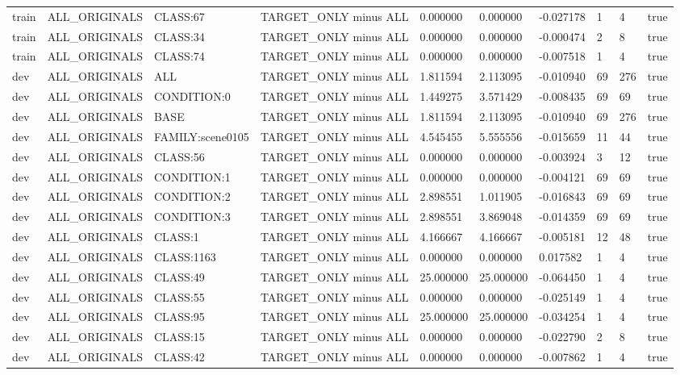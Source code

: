 \begin{tabular}{llllllllll}
train & ALL\_ORIGINALS & CLASS:67 & TARGET\_ONLY minus ALL & 0.000000 & 0.000000 & -0.027178 & 1 & 4 & true \\
train & ALL\_ORIGINALS & CLASS:34 & TARGET\_ONLY minus ALL & 0.000000 & 0.000000 & -0.000474 & 2 & 8 & true \\
train & ALL\_ORIGINALS & CLASS:74 & TARGET\_ONLY minus ALL & 0.000000 & 0.000000 & -0.007518 & 1 & 4 & true \\
dev & ALL\_ORIGINALS & ALL & TARGET\_ONLY minus ALL & 1.811594 & 2.113095 & -0.010940 & 69 & 276 & true \\
dev & ALL\_ORIGINALS & CONDITION:0 & TARGET\_ONLY minus ALL & 1.449275 & 3.571429 & -0.008435 & 69 & 69 & true \\
dev & ALL\_ORIGINALS & BASE & TARGET\_ONLY minus ALL & 1.811594 & 2.113095 & -0.010940 & 69 & 276 & true \\
dev & ALL\_ORIGINALS & FAMILY:scene0105 & TARGET\_ONLY minus ALL & 4.545455 & 5.555556 & -0.015659 & 11 & 44 & true \\
dev & ALL\_ORIGINALS & CLASS:56 & TARGET\_ONLY minus ALL & 0.000000 & 0.000000 & -0.003924 & 3 & 12 & true \\
dev & ALL\_ORIGINALS & CONDITION:1 & TARGET\_ONLY minus ALL & 0.000000 & 0.000000 & -0.004121 & 69 & 69 & true \\
dev & ALL\_ORIGINALS & CONDITION:2 & TARGET\_ONLY minus ALL & 2.898551 & 1.011905 & -0.016843 & 69 & 69 & true \\
dev & ALL\_ORIGINALS & CONDITION:3 & TARGET\_ONLY minus ALL & 2.898551 & 3.869048 & -0.014359 & 69 & 69 & true \\
dev & ALL\_ORIGINALS & CLASS:1 & TARGET\_ONLY minus ALL & 4.166667 & 4.166667 & -0.005181 & 12 & 48 & true \\
dev & ALL\_ORIGINALS & CLASS:1163 & TARGET\_ONLY minus ALL & 0.000000 & 0.000000 & 0.017582 & 1 & 4 & true \\
dev & ALL\_ORIGINALS & CLASS:49 & TARGET\_ONLY minus ALL & 25.000000 & 25.000000 & -0.064450 & 1 & 4 & true \\
dev & ALL\_ORIGINALS & CLASS:55 & TARGET\_ONLY minus ALL & 0.000000 & 0.000000 & -0.025149 & 1 & 4 & true \\
dev & ALL\_ORIGINALS & CLASS:95 & TARGET\_ONLY minus ALL & 25.000000 & 25.000000 & -0.034254 & 1 & 4 & true \\
dev & ALL\_ORIGINALS & CLASS:15 & TARGET\_ONLY minus ALL & 0.000000 & 0.000000 & -0.022790 & 2 & 8 & true \\
dev & ALL\_ORIGINALS & CLASS:42 & TARGET\_ONLY minus ALL & 0.000000 & 0.000000 & -0.007862 & 1 & 4 & true \\

\end{tabular}
